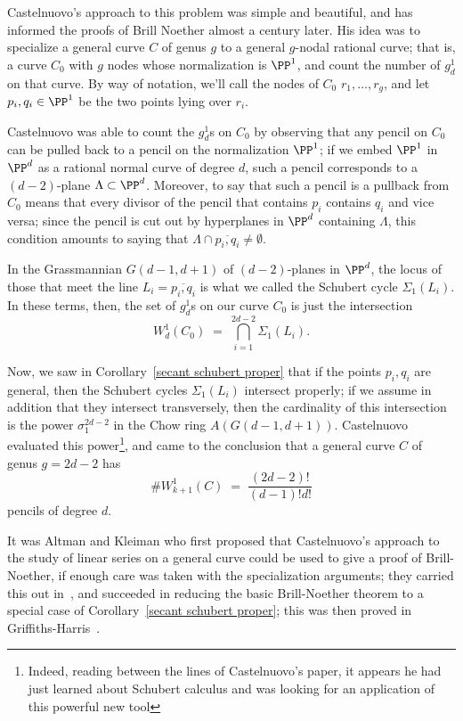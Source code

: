 Castelnuovo's approach to this problem was simple and beautiful, and has informed the proofs of Brill Noether almost a century later. His idea was to specialize a general curve $C$ of genus $g$ to a general $g$-nodal rational curve; that is, a curve $C_0$ with $g$ nodes whose normalization is $\PP^1$, and count the number of $g^1_d$ on that curve. By way of notation, we'll call the nodes of $C_0$ $r_1,\dots,r_g$, and let $p_i, q_i \in \PP^1$ be the two points lying over $r_i$.

Castelnuovo was able to count the $g^1_d$s on $C_0$ by observing that any pencil on $C_0$ can be pulled back to a pencil on the normalization $\PP^1$; if we embed $\PP^1$ in $\PP^d$ as a rational normal curve of degree $d$, such a pencil corresponds to a $(d-2)$-plane $\Lambda \subset \PP^d$. Moreover, to say that such a pencil is a pullback from $C_0$ means that every divisor of the pencil that contains $p_i$ contains $q_i$ and vice versa; since the pencil is cut out by hyperplanes in $\PP^d$ containing $\Lambda$, this condition amounts to saying that $\Lambda \cap \overline{p_i,q_i} \neq \emptyset$.

In the Grassmannian $G(d-1, d+1)$ of $(d-2)$-planes in $\PP^d$, the locus of those that meet the line $L_i = \overline{p_i,q_i}$ is what we called the Schubert cycle $\Sigma_1(L_i)$. In these terms, then, the set of $g^1_d$s on our curve $C_0$ is just the intersection
$$
W^1_d(C_0) \; = \; \bigcap_{i=1}^{2d-2} \Sigma_1(L_i).
$$

Now, we saw in Corollary~\ref{secant schubert proper} that if the points $p_i, q_i$ are general, then the Schubert cycles $\Sigma_1(L_i)$ intersect properly; if we assume in addition that they intersect transversely, then the cardinality of this intersection is the power $\sigma_1^{2d-2}$ in the Chow ring $A(G(d-1, d+1))$. Castelnuovo evaluated this power\footnote{Indeed, reading between the lines of Castelnuovo's paper, it appears he had just learned about Schubert calculus and was looking for an application of this powerful new tool}, and came to the conclusion that a general curve $C$ of genus $g=2d-2$ has 
$$
\#W^1_{k+1}(C) \; = \; \frac{(2d-2)!}{(d-1)!d!}
$$
pencils of degree $d$.

It was Altman and Kleiman who first proposed that Castelnuovo's approach to the study of linear series on a general curve could be used to give a proof of Brill-Noether, if enough care was taken with the specialization arguments; they carried this out in~\cite{}, and succeeded in reducing the basic Brill-Noether theorem to a special case of Corollary~\ref{secant schubert proper}; this was then proved in Griffiths-Harris~\cite{}.

